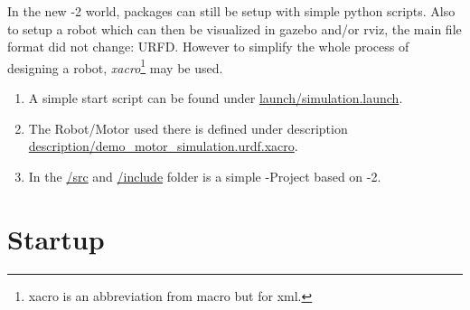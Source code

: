 
In the new -2 world, packages can still be setup with simple python scripts.
Also to setup a robot which can then be visualized in \Gls{gazebo} and/or \Gls{rviz}, the main file format did not change: URFD.
However to simplify the whole process of designing a robot, \textit{xacro}\footnote{xacro is an abbreviation from macro but for xml.} may be used.


\begin{enumerate}
    \item A simple start script can be found under \href{https://github.com/LukyLuke/mse_vt_eeros/blob/main/src/demo_package/launch/simulation.launch.py}{launch/simulation.launch}.

    \item The Robot/Motor used there is defined under description \\ \href{https://github.com/LukyLuke/mse_vt_eeros/blob/main/src/demo_package/description/demo_motor_simulation.urdf.xacro}{description/demo\_motor\_simulation.urdf.xacro}.

    \item In the \href{https://github.com/LukyLuke/mse_vt_eeros/tree/main/src/demo_package/src}{/src} and \href{https://github.com/LukyLuke/mse_vt_eeros/tree/main/src/demo_package/include/demo_package}{/include} folder is a simple -Project based on -2.
\end{enumerate}


\section[startup]{Startup} \label{sec:demo-startup}

